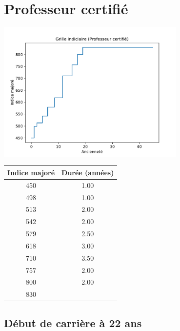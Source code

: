 \newpage 
 
\chapter{Professeur certifié} 

\begin{minipage}{0.55\linewidth}\includegraphics[width=0.7\textwidth]{fig/grille_ProfCertifie.pdf}\end{minipage} 
\begin{minipage}{0.3\linewidth} 
 \begin{center} 

\begin{tabular}[htb]{|c|c|} 
\hline 
 Indice majoré &  Durée (années) \\ 
\hline \hline 
 450 &  1.00 \\ 
\hline 
 498 &  1.00 \\ 
\hline 
 513 &  2.00 \\ 
\hline 
 542 &  2.00 \\ 
\hline 
 579 &  2.50 \\ 
\hline 
 618 &  3.00 \\ 
\hline 
 710 &  3.50 \\ 
\hline 
 757 &  2.00 \\ 
\hline 
 800 &  2.00 \\ 
\hline 
 830 &   \\ 
\hline 
\hline 
\end{tabular} 
\end{center} 
 \end{minipage} 


 \addto{\captionsenglish}{ \renewcommand{\mtctitle}{}} \setcounter{minitocdepth}{2} 
 \minitoc \newpage 

\section{Début de carrière à 22 ans} 

